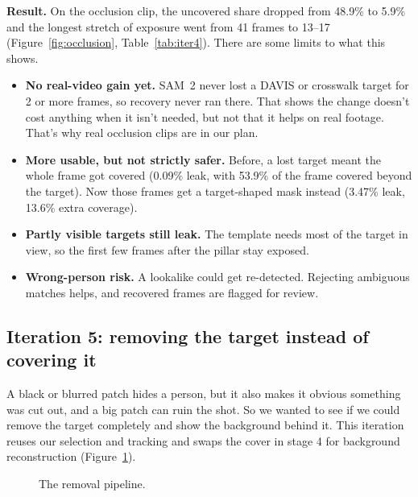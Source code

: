 \textbf{Result.} On the occlusion clip, the uncovered share dropped from 48.9\% to 5.9\% and the
longest stretch of exposure went from 41 frames to 13--17 (Figure~\ref{fig:occlusion},
Table~\ref{tab:iter4}). There are some limits to what this shows.
\begin{itemize}
\item \textbf{No real-video gain yet.} SAM~2 never lost a DAVIS or crosswalk target for 2 or more
frames, so recovery never ran there. That shows the change doesn't cost anything when it isn't
needed, but not that it helps on real footage. That's why real occlusion clips are in our plan.
\item \textbf{More usable, but not strictly safer.} Before, a lost target meant the whole frame got
covered (0.09\% leak, with 53.9\% of the frame covered beyond the target). Now those frames get a
target-shaped mask instead (3.47\% leak, 13.6\% extra coverage).
\item \textbf{Partly visible targets still leak.} The template needs most of the target in view,
so the first few frames after the pillar stay exposed.
\item \textbf{Wrong-person risk.} A lookalike could get re-detected. Rejecting ambiguous matches
helps, and recovered frames are flagged for review.
\end{itemize}

\subsection{Iteration 5: removing the target instead of covering it}

A black or blurred patch hides a person, but it also makes it obvious something was cut out, and a
big patch can ruin the shot. So we wanted to see if we could remove the target completely and show
the background behind it. This iteration reuses our selection and tracking and swaps the cover in
stage 4 for background reconstruction (Figure~\ref{fig:removal-pipeline}).

\begin{figure}[h]
\centering
{}
\caption{The removal pipeline.}
\label{fig:removal-pipeline}
\end{figure}

